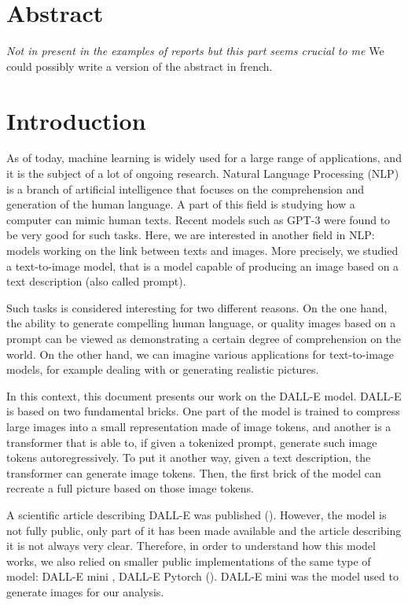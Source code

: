 \documentclass{article}
\begin{document}
\pagebreak
\section{Abstract}
\textit{Not in present in the examples of reports but this part seems crucial to me}
We could possibly write a version of the abstract in french. 

\pagebreak
\section{Introduction}

As of today, machine learning is widely used for a large range of applications, and it is the subject of a lot of ongoing research. Natural Language Processing (NLP) is a branch of artificial intelligence that focuses on the comprehension and generation of the human language. A part of this field is studying how a computer can mimic human texts. Recent models such as GPT-3 were found to be very good for such tasks. Here, we are interested in another field in NLP: models working on the link between texts and images. More precisely, we studied a text-to-image model, that is a model capable of producing an image based on a text description (also called prompt). 

Such tasks is considered interesting for two different reasons. On the one hand, the ability to generate compelling human language, or quality images based on a prompt can be viewed as demonstrating a certain degree of comprehension on the world. On the other hand, we can imagine various applications for text-to-image models, for example dealing with or generating realistic pictures. 

In this context, this document presents our work on the DALL-E model. DALL-E is based on two fundamental bricks. One part of the model is trained to compress large images into a small representation made of image tokens, and another is a transformer that is able to, if given a tokenized prompt, generate such image tokens autoregressively. To put it another way, given a text description, the transformer can generate image tokens. Then, the first brick of the model can recreate a full picture based on those image tokens. 

A scientific article describing DALL-E was published (\cite{zeroshot}). However, the model is not fully public, only part of it has been made available and the article describing it is not always very clear. Therefore, in order to understand how this model works, we also relied on smaller public implementations of the same type of model: DALL-E mini \cite{wandbdallemini}, DALL-E Pytorch (\cite{dallepytorch}). DALL-E mini was the model used to generate images for our analysis. 
\end{document}
